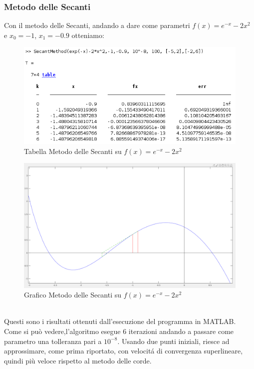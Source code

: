 \documentclass[12pt, letterpaper]{article}
\begin{document}
\subsubsection{Metodo delle Secanti}
Con il metodo delle Secanti, andando a dare come parametri $f(x)=e^{-x}-2x^2$ e $x_0=-1$, $x_1=-0.9$ otteniamo:
\begin{figure}[ht!]
    \includegraphics[scale=0.60]{TabellaEsponenzialeSecant.png}
    \caption{Tabella Metodo delle Secanti su $f(x)=e^{-x}-2x^2$}
\end{figure}
\begin{figure}[ht!]
    \includegraphics[scale=0.40]{EsponenzialeSecant.png}
    \caption{Grafico Metodo delle Secanti su $f(x)=e^{-x}-2x^2$}
\end{figure} \\

Questi sono i risultati ottenuti dall'esecuzione del programma in MATLAB.\\ Come si può vedere,l'algoritmo esegue 6 iterazioni andando a passare come parametro una tolleranza pari a $10^{-8}$.
Usando due punti iniziali, riesce ad approssimare, come prima riportato, con velocit\'a di convergenza superlineare, quindi più veloce rispetto al metodo delle corde.
\end{document}
